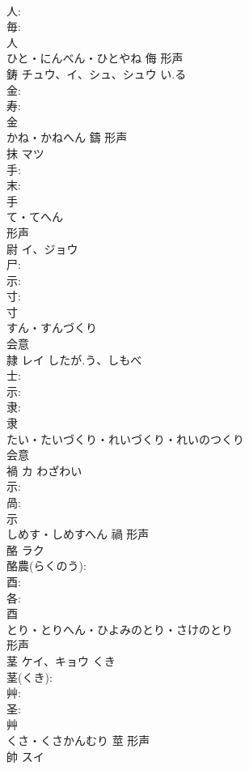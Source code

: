 \documentclass[8pt]{extreport}
\begin{document}
\begin{CJK}{UTF8}{min}
\\	人: 
\\	毎: 
\\	人	
\\	ひと・にんべん・ひとやね	侮	形声 
\\	鋳	チュウ、イ、シュ、シュウ	い.る		
\\	金: 
\\	寿: 
\\	金	
\\	かね・かねへん	鑄	形声 
\\	抹	マツ			
\\	手: 
\\	末: 
\\	手	
\\	て・てへん	
\\	形声 
\\	尉	イ、ジョウ			
\\	尸: 
\\	示: 
\\	寸: 
\\	寸	
\\	すん・すんづくり	
\\	会意 
\\	隷	レイ	したが.う、しもべ		
\\	士: 
\\	示: 
\\	隶: 
\\	隶	
\\	たい・たいづくり・れいづくり・れいのつくり	
\\	会意 
\\	禍	カ	わざわい		
\\	示: 
\\	咼: 
\\	示	
\\	しめす・しめすへん	禍	形声 
\\	酪	ラク			
\\	酪農(らくのう): 
\\	酉: 
\\	各: 
\\	酉	
\\	とり・とりへん・ひよみのとり・さけのとり	
\\	形声 
\\	茎	ケイ、キョウ	くき		
\\	茎(くき): 
\\	艸: 
\\	圣: 
\\	艸	
\\	くさ・くさかんむり	莖	形声 
\\	帥	スイ			

\end{CJK}
\end{document}
